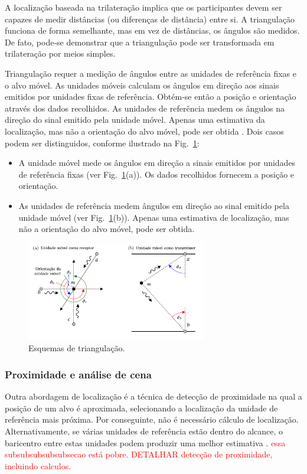 A localização baseada na trilateração implica que os participantes devem ser capazes de medir distâncias (ou diferenças de distância) entre si. A triangulação funciona de forma semelhante, mas em vez de distâncias, os ângulos são medidos. De fato, pode-se demonstrar que a triangulação pode ser transformada em trilateração por meios simples\cite{linde2006aspects}. 

Triangulação requer a medição de ângulos entre as unidades de referência fixas e o alvo móvel. As unidades móveis calculam os ângulos em direção aos sinais emitidos por unidades fixas de referência. Obtém-se então a posição e orientação através dos dados recolhidos. As unidades de referência medem os ângulos na direção do sinal emitido pela unidade móvel. Apenas uma estimativa da localização, mas não a orientação do alvo móvel, pode ser obtida \cite{lutzke2013experimental}. Dois casos podem ser distinguidos, conforme ilustrado na Fig.~\ref{fig:triang}:


\begin{itemize}
  \item A unidade móvel mede os ângulos em direção a sinais emitidos por unidades de referência fixas (ver Fig.~\ref{fig:triang}(a)). Os dados recolhidos fornecem a posição e orientação.
  \item As unidades de referência medem ângulos em direção ao sinal emitido pela unidade móvel (ver Fig.~\ref{fig:triang}(b)). Apenas uma estimativa de localização, mas não a orientação do alvo móvel, pode ser obtida.
 \end{itemize}


\begin{figure}[ht]
\centering
\includegraphics[resolution=300,width=0.7\textwidth,natwidth=610,natheight=642]{images/triangulacao.png}
    \caption{Esquemas de triangulação.}
    \label{fig:triang}
\end{figure}
 
\subsubsection{Proximidade e análise de cena}\label{sec:proximidade}
Outra abordagem de localização é a técnica de detecção de proximidade na qual a posição de um alvo é aproximada, selecionando a localização da unidade de referência mais próxima. Por conseguinte, não é necessário cálculo de localização. Alternativamente, se várias unidades de referência estão dentro do alcance, o baricentro entre estas unidades podem produzir uma melhor estimativa \cite{EHuber1996}.
 \textcolor{red}{essa subsubsubsubsubsecao está pobre. DETALHAR detecção de proximidade, incluindo calculos.}

